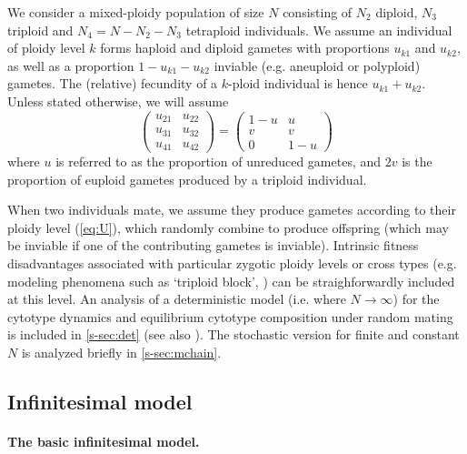 \documentclass[11pt,a4paper]{article}
\begin{document}
We consider a mixed-ploidy population of size $N$ consisting of $N_2$ diploid,
$N_3$ triploid and $N_4=N-N_2-N_3$ tetraploid individuals.
We assume an individual of ploidy level $k$ forms haploid and diploid gametes
with proportions $u_{k1}$ and $u_{k2}$, as well as a proportion
$1-u_{k1}-u_{k2}$ inviable (e.g. aneuploid or polyploid) gametes.
The (relative) fecundity of a $k$-ploid individual is hence $u_{k1} + u_{k2}$.
Unless stated otherwise, we will assume 
\begin{equation}
    \begin{pmatrix} 
    u_{21} & u_{22} \\ 
    u_{31} & u_{32} \\ 
    u_{41} & u_{42} 
    \end{pmatrix} =
    \begin{pmatrix} 
    1-u & u \\
    v & v \\
    0 & 1-u
    \end{pmatrix} \label{eq:U}
\end{equation}
where $u$ is referred to as the proportion of unreduced gametes, and $2v$ is
the proportion of euploid gametes produced by a triploid individual.

When two individuals mate, we assume they produce gametes according to their
ploidy level (\cref{eq:U}), which randomly combine to produce offspring (which
may be inviable if one of the contributing gametes is inviable).
Intrinsic fitness disadvantages associated with particular zygotic ploidy
levels or cross types (e.g. modeling phenomena such as `triploid block',
\citep{ramsey1998,brown2024}) can be straighforwardly included at this level.
An analysis of a deterministic model (i.e. where $N \rightarrow \infty$) for
the cytotype dynamics and equilibrium cytotype composition under random mating
is included in \cref{s-sec:det} (see also \cite{felber1997,kauai2024}).
The stochastic version for finite and constant $N$ is analyzed briefly in
\cref{s-sec:mchain}.

\subsection*{Infinitesimal model}

\paragraph*{The basic infinitesimal model.}
\end{document}
